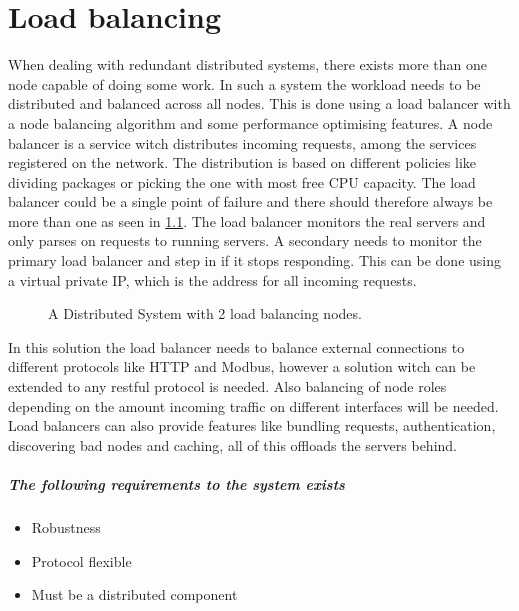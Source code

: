 \chapter{Load balancing}

When dealing with redundant distributed systems, there exists more than one node capable of doing some work.
In such a system the workload needs to be distributed and balanced across all nodes.
This is done using a load balancer with a node balancing algorithm and some performance optimising features.
A node balancer is a service witch distributes incoming requests, among the services registered on the network.
The distribution is based on different policies like dividing packages or picking the one with most free CPU capacity.
The load balancer could be a single point of failure and there should therefore always be more than one as seen in \cref{fig:loadBalancingSetup}.
The load balancer monitors the real servers and only parses on requests to running servers.
A secondary needs to monitor the primary load balancer and step in if it stops responding. This can be done using a virtual private IP, which is the address for all incoming requests.

\begin{figure}
	\centering	
	\scalebox{0.7}{}
	\caption[Distributed System with 2 load balancing nodes]{
		\label{fig:loadBalancingSetup} 
		\footnotesize{%
			A Distributed System with 2 load balancing nodes.
		}
	}
\end{figure}

In this solution the load balancer needs to balance external connections to different protocols like HTTP and Modbus, however a solution witch can be extended to any restful protocol is needed.
Also balancing of node roles depending on the amount incoming traffic on different interfaces will be needed.
Load balancers can also provide features like bundling requests, authentication, discovering bad nodes and caching, all of this offloads the servers behind.

\paragraph{The following requirements to the system exists}
\begin{itemize}
	\item Robustness
	\item Protocol flexible
	\item Must be a distributed component
\end{itemize}

